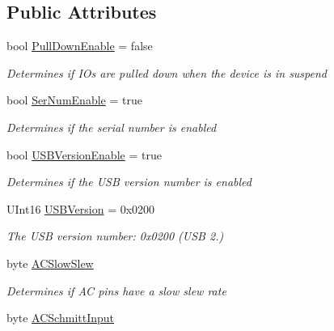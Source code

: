 \subsection*{Public Attributes}
\begin{DoxyCompactItemize}
\item 
bool \mbox{\hyperlink{class_f_t_d2_x_x___n_e_t_1_1_f_t_d_i_1_1_f_t___x_s_e_r_i_e_s___e_e_p_r_o_m___s_t_r_u_c_t_u_r_e_a52d6a4678cfb03c678a3e506f1f2f9e8}{Pull\+Down\+Enable}} = false
\begin{DoxyCompactList}\small\item\em Determines if I\+Os are pulled down when the device is in suspend \end{DoxyCompactList}\item 
bool \mbox{\hyperlink{class_f_t_d2_x_x___n_e_t_1_1_f_t_d_i_1_1_f_t___x_s_e_r_i_e_s___e_e_p_r_o_m___s_t_r_u_c_t_u_r_e_a4a85369ce450919ba970f099e8276ea9}{Ser\+Num\+Enable}} = true
\begin{DoxyCompactList}\small\item\em Determines if the serial number is enabled \end{DoxyCompactList}\item 
bool \mbox{\hyperlink{class_f_t_d2_x_x___n_e_t_1_1_f_t_d_i_1_1_f_t___x_s_e_r_i_e_s___e_e_p_r_o_m___s_t_r_u_c_t_u_r_e_ad7c9aa4c65cc62a701a7df3d5a6d881f}{U\+S\+B\+Version\+Enable}} = true
\begin{DoxyCompactList}\small\item\em Determines if the U\+SB version number is enabled \end{DoxyCompactList}\item 
U\+Int16 \mbox{\hyperlink{class_f_t_d2_x_x___n_e_t_1_1_f_t_d_i_1_1_f_t___x_s_e_r_i_e_s___e_e_p_r_o_m___s_t_r_u_c_t_u_r_e_ac9dd9d8ab690fab2e6b578a1c23c86a2}{U\+S\+B\+Version}} = 0x0200
\begin{DoxyCompactList}\small\item\em The U\+SB version number\+: 0x0200 (U\+SB 2.) \end{DoxyCompactList}\item 
byte \mbox{\hyperlink{class_f_t_d2_x_x___n_e_t_1_1_f_t_d_i_1_1_f_t___x_s_e_r_i_e_s___e_e_p_r_o_m___s_t_r_u_c_t_u_r_e_a79e1f6f9b07f283931808c166c7f887a}{A\+C\+Slow\+Slew}}
\begin{DoxyCompactList}\small\item\em Determines if AC pins have a slow slew rate \end{DoxyCompactList}\item 
byte \mbox{\hyperlink{class_f_t_d2_x_x___n_e_t_1_1_f_t_d_i_1_1_f_t___x_s_e_r_i_e_s___e_e_p_r_o_m___s_t_r_u_c_t_u_r_e_af6db37d08dce86ddd9712b100cbb3ccc}{A\+C\+Schmitt\+Input}}

\end{DoxyCompactItemize}
